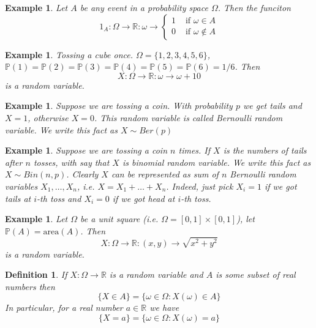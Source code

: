 \documentclass[12pt]{article}
\newtheorem{definition}[theorem]{Definition}
\newtheorem{example}[theorem]{Example}
\begin{document}
\begin{example} Let $A$ be any event in a probability space $\Omega$. Then the
    funciton
    $$
        1_A:\Omega\to\mathbb{R}:\omega\to
        \begin{cases}
            1 & \mbox{ if }\omega\in A    \\
            0 & \mbox{ if }\omega\notin A
        \end{cases}
    $$
\end{example}

\begin{example} Tossing a cube once.
    $\Omega=\{1,2,3,4,5,6\}$,
    $\mathbb{P}(1)
        =\mathbb{P}(2)
        =\mathbb{P}(3)
        =\mathbb{P}(4)
        =\mathbb{P}(5)
        =\mathbb{P}(6)
        =1/6$.
    Then
    $$
        X:\Omega\to\mathbb{R}:\omega\to \omega+10
    $$
    is a random variable.
\end{example}

\begin{example} Suppose we are tossing a coin. With probability $p$ we get tails
    and $X=1$, otherwise $X=0$. This random variable is called Bernoulli random
    variable. We write this fact as $X\sim Ber(p)$
\end{example}

\begin{example} Suppose we are tossing a coin $n$ times. If $X$ is the numbers
    of tails after $n$ tosses, with say that $X$ is binomial random variable. We
    write this fact as $X\sim Bin(n,p)$. Clearly $X$ can be represented as sum
    of $n$ Bernoulli random variables $X_1,\ldots,X_n$, i.e.
    $X=X_1+\ldots+X_n$.    %
    Indeed, just pick $X_i=1$ if we got tails at $i$-th toss and $X_i=0$ if we
    got head at $i$-th toss.
\end{example}

\begin{example} Let $\Omega$ be a unit square (i.e. $\Omega=[0,1]\times[0,1]$),
    let $\mathbb{P}(A)=\mbox{area}(A)$. Then
    $$
        X:\Omega\to\mathbb{R}:(x,y)\to\sqrt{x^2+y^2}
    $$
    is a random variable.
\end{example}

\begin{definition} If $X:\Omega\to\mathbb{R}$ is a random variable and $A$ is
    some subset of real numbers then
    $$
        \{X\in A\}=\{\omega\in\Omega:X(\omega)\in A\}
    $$
    In particular, for a real number $a\in\mathbb{R}$ we have
    $$
        \{X=a\}=\{\omega\in\Omega:X(\omega)=a\}
    $$
\end{definition}
\end{document}
